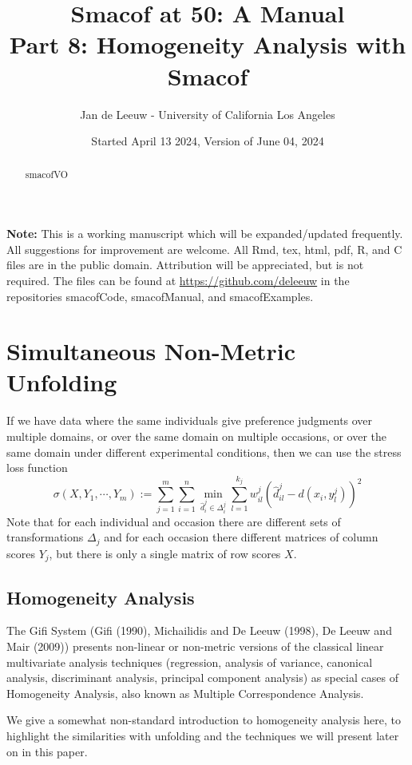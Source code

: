\documentclass[
  12pt,
]{article}
\title{Smacof at 50: A Manual\\
Part 8: Homogeneity Analysis with Smacof}
\author{Jan de Leeuw - University of California Los Angeles}
\date{Started April 13 2024, Version of June 04, 2024}
\begin{document}
\maketitle
\begin{abstract}
smacofVO
\end{abstract}

{
\setcounter{tocdepth}{3}
\tableofcontents
}
\textbf{Note:} This is a working manuscript which will be expanded/updated
frequently. All suggestions for improvement are welcome. All Rmd, tex,
html, pdf, R, and C files are in the public domain. Attribution will be
appreciated, but is not required. The files can be found at
\url{https://github.com/deleeuw} in the repositories smacofCode, smacofManual,
and smacofExamples.

\section{Simultaneous Non-Metric Unfolding}\label{simultaneous-non-metric-unfolding}

If we have data where the same individuals give preference
judgments over multiple domains, or over the same domain on multiple occasions, or over the same domain under different experimental conditions,
then we can use the stress loss function
\begin{equation}
\sigma(X,Y_1,\cdots,Y_m):=\sum_{j=1}^m\sum_{i=1}^n\min_{\hat d_i^j\in\Delta_i^j}\sum_{l=1}^{k_j}w_{il}^j(\hat d_{il}^j-d(x_i,y_l^j))^2
\label{eq:snmu}
\end{equation}
Note that for each individual and occasion there are different sets of transformations \(\Delta_j\)
and for each occasion there different matrices of column scores \(Y_j\), but there is only a single matrix of row scores \(X\).

\subsection{Homogeneity Analysis}\label{homogeneity-analysis}

The Gifi System (Gifi (1990), Michailidis and De Leeuw (1998), De Leeuw and Mair (2009)) presents non-linear or non-metric versions of the classical linear multivariate analysis techniques (regression, analysis of variance, canonical analysis, discriminant analysis, principal component analysis) as special cases of Homogeneity Analysis, also known as Multiple Correspondence Analysis.

We give a somewhat non-standard introduction to homogeneity analysis here, to highlight the
similarities with unfolding and the techniques we will present later on in this paper.
\end{document}
